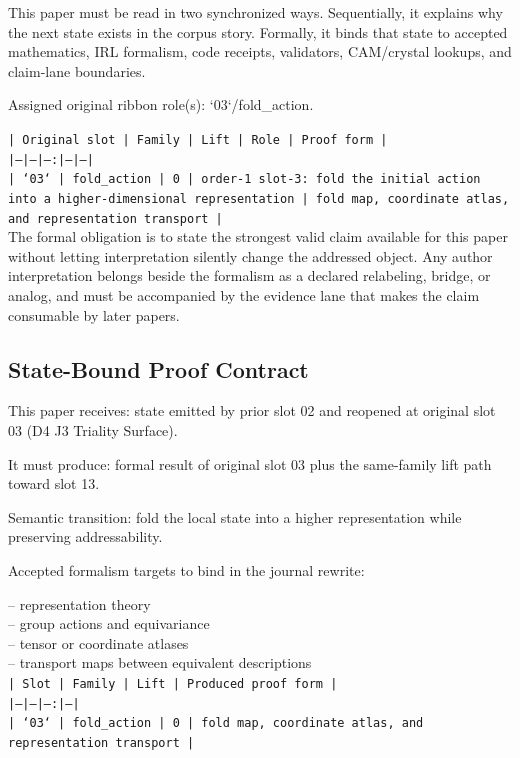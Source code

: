 \documentclass[11pt]{article}
\begin{document}
This paper must be read in two synchronized ways. Sequentially, it explains why
the next state exists in the corpus story. Formally, it binds that state to
accepted mathematics, IRL formalism, code receipts, validators, CAM/crystal
lookups, and claim-lane boundaries.

Assigned original ribbon role(s): `03`/fold\_action.

\noindent\texttt{| Original slot | Family | Lift | Role | Proof form |}\\
\noindent\texttt{|---|---|---:|---|---|}\\
\noindent\texttt{| `03` | fold\_action | 0 | order-1 slot-3: fold the initial action into a higher-dimensional representation | fold map, coordinate atlas, and representation transport |}\\

The formal obligation is to state the strongest valid claim available for this
paper without letting interpretation silently change the addressed object. Any
author interpretation belongs beside the formalism as a declared relabeling,
bridge, or analog, and must be accompanied by the evidence lane that makes the
claim consumable by later papers.

\subsection*{State-Bound Proof Contract}

This paper receives: state emitted by prior slot 02 and reopened at original slot 03 (D4 J3 Triality Surface).

It must produce: formal result of original slot 03 plus the same-family lift path toward slot 13.

Semantic transition: fold the local state into a higher representation while preserving addressability.

Accepted formalism targets to bind in the journal rewrite:

\noindent{}-- representation theory\\
\noindent{}-- group actions and equivariance\\
\noindent{}-- tensor or coordinate atlases\\
\noindent{}-- transport maps between equivalent descriptions\\

\noindent\texttt{| Slot | Family | Lift | Produced proof form |}\\
\noindent\texttt{|---|---|---:|---|}\\
\noindent\texttt{| `03` | fold\_action | 0 | fold map, coordinate atlas, and representation transport |}\\
\end{document}
